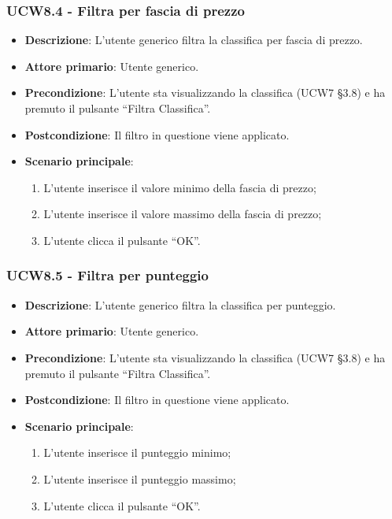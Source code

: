 \subsubsection{UCW8.4 - Filtra per fascia di prezzo}
\begin{itemize}
	\item \textbf{Descrizione}: L'utente generico filtra la classifica per fascia di prezzo.
    \item \textbf{Attore primario}: Utente generico.
    \item \textbf{Precondizione}: L’utente sta visualizzando la classifica (UCW7 §3.8) e ha premuto il pulsante “Filtra Classifica”.
    \item \textbf{Postcondizione}: Il filtro in questione viene applicato.
    \item \textbf{Scenario principale}: 
    \begin{enumerate}
        \item L’utente inserisce il valore minimo della fascia di prezzo;
        \item L’utente inserisce il valore massimo della fascia di prezzo;
        \item L’utente clicca il pulsante “OK”.
    \end{enumerate}
\end{itemize}

\subsubsection{UCW8.5 - Filtra per punteggio}
\begin{itemize}
	\item \textbf{Descrizione}: L'utente generico filtra la classifica per punteggio.
    \item \textbf{Attore primario}: Utente generico.
    \item \textbf{Precondizione}: L’utente sta visualizzando la classifica (UCW7 §3.8) e ha premuto il pulsante “Filtra Classifica”.
    \item \textbf{Postcondizione}: Il filtro in questione viene applicato.
    \item \textbf{Scenario principale}: 
    \begin{enumerate}
        \item L’utente inserisce il punteggio minimo;
        \item L’utente inserisce il punteggio massimo;
        \item L’utente clicca il pulsante “OK”.
    \end{enumerate}
\end{itemize}

